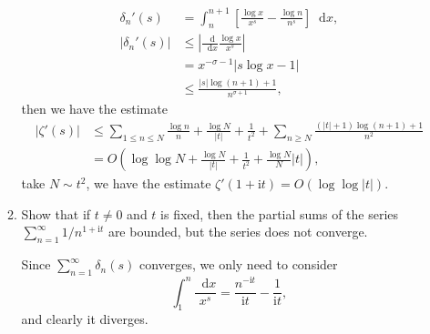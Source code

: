 \documentclass[11pt]{report}
\theoremstyle{mythm}
\let\oldendproof\endproof
\renewenvironment{proof}[1][\proofname]{%
  \oldproof[\normalfont \bfseries #1]%
}{\oldendproof}
\renewcommand*{\proofname}{Proof}
\theoremstyle{myans}
\newcommand{\mi}{\mathrm{i}}
\newcommand{\dd}{\mathop{}\!\mathrm{d}}
\begin{document}
\begin{enumerate}
\begin{enumerate}
\begin{proof}
\begin{align*}
        \delta_n'(s) &= \int_n^{n+1} \left[\frac{\log x}{x^s} - \frac{\log n}{n^s}\right] \dd x,\\
        \left| \delta_n'(s)\right| &\leq \left| \frac{\dd}{\dd x} \frac{\log x}{x^s} \right|\\
        &= x^{-\sigma - 1} |s \log x - 1|\\
        &\leq \frac{|s|\log (n+1) + 1}{n^{\sigma + 1}},
      \end{align*}
      then we have the estimate
      \begin{align*}
        |\zeta'(s)| &\leq \sum_{1\leq n\leq N} \frac{\log n}{n} + \frac{\log N}{|t|}
        + \frac 1{t^2} + \sum_{n\geq N}\frac{(|t|+1)\log(n+1) + 1}{n^2}\\
        &= O\left( \log\log N + \frac{\log N}{|t|} + \frac 1{t^2} + \frac{\log N}{N}|t| \right),
      \end{align*}
      take $N \sim t^2$, we have the estimate $\zeta'(1 + \mi t) = O(\log\log |t|)$.
    \end{proof}
    \item  Show that if $t\neq 0$ and $t$ is fixed, then the partial sums of the series
    $\sum_{n=1}^\infty 1/n^{1+\mi t}$ are bounded, but the series does not converge.
    \begin{proof}
      Since $\sum_{n=1}^\infty \delta_n(s)$ converges, we only need to consider
      \[ \int_1^n \frac {\dd x}{x^s} = \frac{n^{-\mi t}}{\mi t} - \frac 1{\mi t}, \]
      and clearly it diverges.
    \end{proof}
  \end{enumerate}
\end{enumerate}
\end{document}
